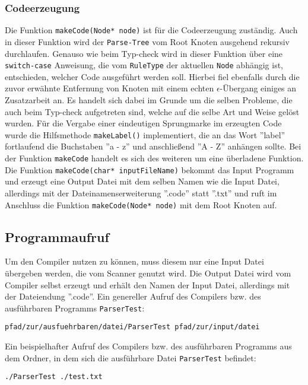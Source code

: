 \documentclass[
a4paper,   %
11pt,      %
oneside,   %
onecolumn, %
final      %
]{article}
\newcommand{\code}[1]{\lstinline$#1$}
\begin{document}
\subsubsection{Codeerzeugung}
Die Funktion \code{makeCode(Node* node)} ist für die Codeerzeugung zuständig. Auch in dieser Funktion wird der \code{Parse-Tree} vom Root Knoten ausgehend rekursiv durchlaufen. Genauso wie beim Typ-check wird in dieser Funktion über eine \code{switch-case} Anweisung, die vom \code{RuleType} der aktuellen \code{Node} abhängig ist, entschieden, welcher Code ausgeführt werden soll. Hierbei fiel ebenfalls durch die zuvor erwähnte Entfernung von Knoten mit einem echten $\epsilon$-Übergang einiges an Zusatzarbeit an. Es handelt sich dabei im Grunde um die selben Probleme, die auch beim Typ-check aufgetreten sind, welche auf die selbe Art und Weise gelöst wurden. Für die Vergabe einer eindeutigen Sprungmarke im erzeugten Code wurde die Hilfsmethode \code{makeLabel()} implementiert, die an das Wort ''label'' fortlaufend die Buchstaben ''a - z'' und anschließend ''A - Z'' anhängen sollte. Bei der Funktion \code{makeCode} handelt es sich des weiteren um eine überladene Funktion. Die Funktion \code{makeCode(char* inputFileName)} bekommt das Input Programm und erzeugt eine Output Datei mit dem selben Namen wie die Input Datei, allerdings mit der Dateinamenserweiterung ''.code'' statt ''.txt'' und ruft im Anschluss die Funktion \code{makeCode(Node* node)} mit dem Root Knoten auf.

\subsection{Programmaufruf}
Um den Compiler nutzen zu können, muss diesem nur eine Input Datei übergeben werden, die vom Scanner genutzt wird. Die Output Datei wird vom Compiler selbst erzeugt und erhält den Namen der Input Datei, allerdings mit der Dateiendung ''.code''. Ein genereller Aufruf des Compilers bzw. des ausführbaren Programms \code{ParserTest}:
\begin{lstlisting}[language=PseudoCode, caption={}, label=lst:callParser1]
pfad/zur/ausfuehrbaren/datei/ParserTest pfad/zur/input/datei
\end{lstlisting}
Ein beispielhafter Aufruf des Compilers bzw. des ausführbaren Programms aus dem Ordner, in dem sich die ausführbare Datei \code{ParserTest} befindet:
\begin{lstlisting}[language=PseudoCode, caption={}, label=lst:callParser2]
./ParserTest ./test.txt
\end{lstlisting}
\end{document}
